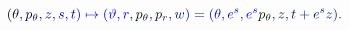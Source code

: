 \documentclass[12pt]{article}
\begin{document}
\makeatletter
\renewcommand*{\@textcolor}[3]{%
  \protect\leavevmode
  \begingroup
    \color#1{#2}#3%
  \endgroup
}
\makeatother
\begin{displaymath}
\mathcolor[RGB]{0,0,15}{(} \mathcolor[RGB]{0,0,30}{\theta} \mathcolor[RGB]{0,0,45}{,} \mathcolor[RGB]{0,0,60}{p} _ { \mathcolor[RGB]{0,0,75}{\theta} } \mathcolor[RGB]{0,0,90}{,} \mathcolor[RGB]{0,0,105}{z} \mathcolor[RGB]{0,0,120}{,} \mathcolor[RGB]{0,0,135}{s} \mathcolor[RGB]{0,0,150}{,} \mathcolor[RGB]{0,0,165}{t} \mathcolor[RGB]{0,0,180}{)} \mathcolor[RGB]{0,0,195}{\mapsto} \mathcolor[RGB]{0,0,210}{(} \mathcolor[RGB]{0,0,225}{\vartheta} \mathcolor[RGB]{0,0,240}{,} \mathcolor[RGB]{0,0,255}{r} \mathcolor[RGB]{0,15,0}{,} \mathcolor[RGB]{0,15,15}{p} _ { \mathcolor[RGB]{0,15,30}{\theta} } \mathcolor[RGB]{0,15,45}{,} \mathcolor[RGB]{0,15,60}{p} _ { \mathcolor[RGB]{0,15,75}{r} } \mathcolor[RGB]{0,15,90}{,} \mathcolor[RGB]{0,15,105}{w} \mathcolor[RGB]{0,15,120}{)} \mathcolor[RGB]{0,15,135}{=} \mathcolor[RGB]{0,15,150}{(} \mathcolor[RGB]{0,15,165}{\theta} \mathcolor[RGB]{0,15,180}{,} \mathcolor[RGB]{0,15,195}{e} ^ { \mathcolor[RGB]{0,15,210}{s} } \mathcolor[RGB]{0,15,225}{,} \mathcolor[RGB]{0,15,240}{e} ^ { \mathcolor[RGB]{0,15,255}{s} } \mathcolor[RGB]{0,30,0}{p} _ { \mathcolor[RGB]{0,30,15}{\theta} } \mathcolor[RGB]{0,30,30}{,} \mathcolor[RGB]{0,30,45}{z} \mathcolor[RGB]{0,30,60}{,} \mathcolor[RGB]{0,30,75}{t} \mathcolor[RGB]{0,30,90}{+} \mathcolor[RGB]{0,30,105}{e} ^ { \mathcolor[RGB]{0,30,120}{s} } \mathcolor[RGB]{0,30,135}{z} \mathcolor[RGB]{0,30,150}{)} \mathcolor[RGB]{0,30,165}{.}
\end{displaymath}
\end{document}
